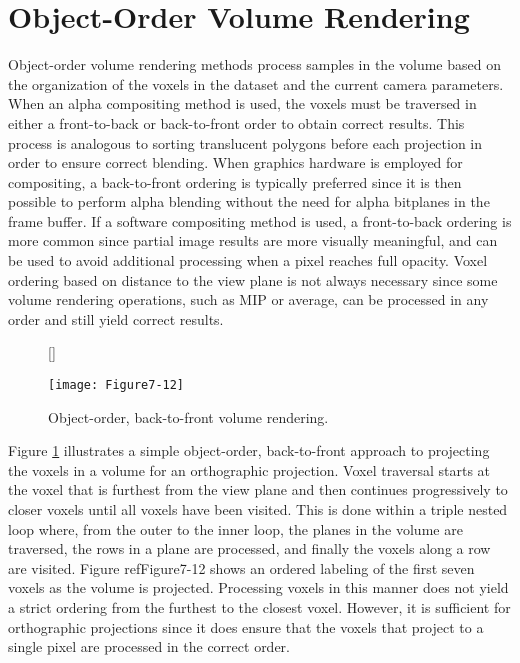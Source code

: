 \section{Object-Order Volume Rendering}

Object-order volume rendering methods process samples in the volume based on the organization of the voxels in the dataset and the current camera parameters. When an alpha compositing method is used, the voxels must be traversed in either a front-to-back or back-to-front order to obtain correct results. This process is analogous to sorting translucent polygons before each projection in order to ensure correct blending. When graphics hardware is employed for compositing, a back-to-front ordering is typically preferred since it is then possible to perform alpha blending without the need for alpha bitplanes in the frame buffer. If a software compositing method is used, a front-to-back ordering is more common since partial image results are more visually meaningful, and can be used to avoid additional processing when a pixel reaches full opacity. Voxel ordering based on distance to the view plane is not always necessary since some volume rendering operations, such as MIP or average, can be processed in any order and still yield correct results.

\begin{figure}[!htb]
	[\FBwidth]
	{\caption{Object-order, back-to-front volume rendering.}\label{fig:Figure7-12}}
	{\texttt{[image: Figure7-12]}}
\end{figure}

Figure \ref{fig:Figure7-12} illustrates a simple object-order, back-to-front approach to projecting the voxels in a volume for an orthographic projection. Voxel traversal starts at the voxel that is furthest from the view plane and then continues progressively to closer voxels until all voxels have been visited. This is done within a triple nested loop where, from the outer to the inner loop, the planes in the volume are traversed, the rows in a plane are processed, and finally the voxels along a row are visited. Figure ref{Figure7-12} shows an ordered labeling of the first seven voxels as the volume is projected. Processing voxels in this manner does not yield a strict ordering from the furthest to the closest voxel. However, it is sufficient for orthographic projections since it does ensure that the voxels that project to a single pixel are processed in the correct order.

